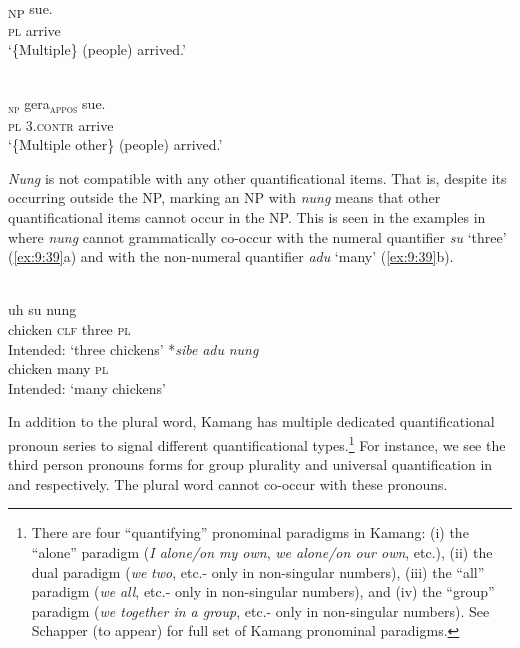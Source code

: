 \ea%
\label{ex:9:37}
 \\
\gll  [Nung]\textsubscript{NP} sue. \\
   \textsc{pl} arrive  \\
\glt `\{Multiple\} (people) arrived.'
\z







\ea%
\label{ex:9:38}
 \\
\gll  [{Nung}]\textsubscript{\textsc{np}} {gera}\textsubscript{\textsc{appos}} sue. \\
   \textsc{pl} \textsc{3.contr} arrive  \\
\glt `\{Multiple other\} (people) arrived.'
\z






\textit{Nung} is not compatible with any other quantificational items. That is, despite its occurring outside the NP, marking an NP with \textit{nung} means that other quantificational items cannot occur in the NP. This is seen in the examples in  where \textit{nung} cannot grammatically co-occur with the numeral quantifier \textit{su} `three' (\ref{ex:9:39}a) and with the non-numeral quantifier \textit{adu} `many' (\ref{ex:9:39}b).


\ea%
\label{ex:9:39}
 \\
\ea
{} uh su {nung}\\
   chicken \textsc{clf} three \textsc{pl} \\
\glt Intended: `three chickens'
\ex
\gll
*\textit{sibe} \textit{adu} \textit{nung}\\
    chicken many   \textsc{pl}\\
\glt  Intended: `many chickens'
 \z
 \z




In addition to the plural word, Kamang has multiple dedicated quantificational pronoun series to signal different quantificational types.\footnote{There are four ``quantifying'' pronominal paradigms in Kamang: (i) the ``alone'' paradigm (\textit{I alone/on my own}, \textit{we alone/on our own}, etc.), (ii) the dual paradigm (\textit{we} \textit{two}, etc.- only in non-singular numbers), (iii) the ``all'' paradigm (\textit{we} \textit{all}, etc.- only in non-singular numbers), and (iv) the ``group'' paradigm (\textit{we together in a group}, etc.- only in non-singular numbers). See Schapper (to appear) for full set of Kamang pronominal paradigms.} For instance, we see the third person pronouns forms for group plurality and universal quantification in  and  respectively. The plural word cannot co-occur with these pronouns.


